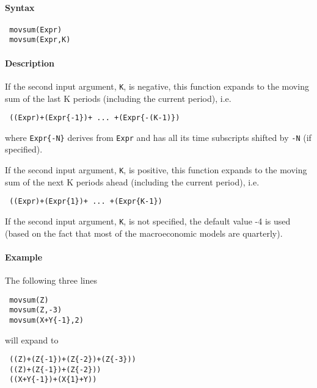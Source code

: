 


	\paragraph{Syntax}
 
 \begin{verbatim}
 movsum(Expr)
 movsum(Expr,K)
 \end{verbatim}
 
 \paragraph{Description}
 
 If the second input argument, \texttt{K}, is negative, this function
 expands to the moving sum of the last K periods (including the current
 period), i.e.
 
 \begin{verbatim}
 ((Expr)+(Expr{-1})+ ... +(Expr{-(K-1)})
 \end{verbatim}
 
 where \texttt{Expr\{-N\}} derives from \texttt{Expr} and has all its
 time subscripts shifted by \texttt{-N} (if specified).
 
 If the second input argument, \texttt{K}, is positive, this function
 expands to the moving sum of the next K periods ahead (including the
 current period), i.e.
 
 \begin{verbatim}
 ((Expr)+(Expr{1})+ ... +(Expr{K-1})
 \end{verbatim}
 
 If the second input argument, \texttt{K}, is not specified, the default
 value -4 is used (based on the fact that most of the macroeconomic
 models are quarterly).
 
 \paragraph{Example}
 
 The following three lines
 
 \begin{verbatim}
 movsum(Z)
 movsum(Z,-3)
 movsum(X+Y{-1},2)
 \end{verbatim}
 
 will expand to
 
 \begin{verbatim}
 ((Z)+(Z{-1})+(Z{-2})+(Z{-3}))
 ((Z)+(Z{-1})+(Z{-2}))
 ((X+Y{-1})+(X{1}+Y))
 \end{verbatim}


